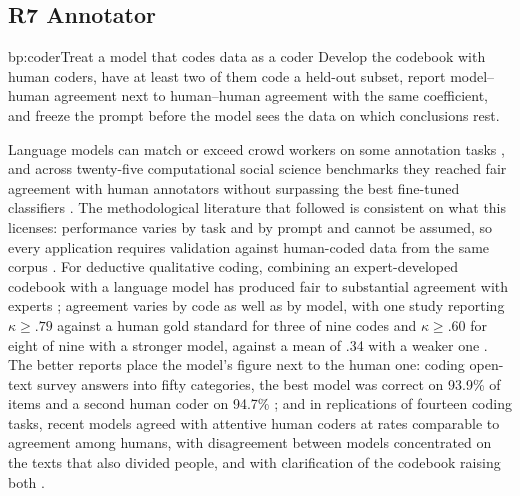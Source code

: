 \subsection{R7 Annotator}

\begin{practice}{bp:coder}{Treat a model that codes data as a coder}
Develop the codebook with human coders, have at least two of them code a
held-out subset, report model--human agreement next to human--human agreement
with the same coefficient, and freeze the prompt before the model sees the
data on which conclusions rest.
\end{practice}

Language models can match or exceed crowd workers on some annotation tasks
\cite{gilardi2023chatgpt}, and across twenty-five computational social
science benchmarks they reached fair agreement with human annotators
without surpassing the best fine-tuned classifiers \cite{ziems2024can}. The methodological literature that followed is
consistent on what this licenses: performance varies by task and by prompt
and cannot be assumed, so every application requires validation against
human-coded data from the same corpus
\cite{pangakis2023automated,tornberg2024best}. For deductive qualitative
coding, combining an expert-developed codebook with a language model has
produced fair to substantial agreement with experts \cite{xiao2023supporting};
agreement varies by code as well as by model, with one study reporting
$\kappa\geq.79$ against a human gold standard for three of nine codes and
$\kappa\geq.60$ for eight of nine with a stronger model, against a mean of
.34 with a weaker one \cite{dunivin2024scalable}. The better reports place
the model's figure next to the human one: coding open-text survey answers
into fifty categories, the best model was correct on 93.9\% of items and a
second human coder on 94.7\% \cite{mellon2024do}; and in replications of
fourteen coding tasks, recent models agreed with attentive human coders at
rates comparable to agreement among humans, with disagreement between models
concentrated on the texts that also divided people, and with clarification
of the codebook raising both \cite{nakamura2026observational}.


